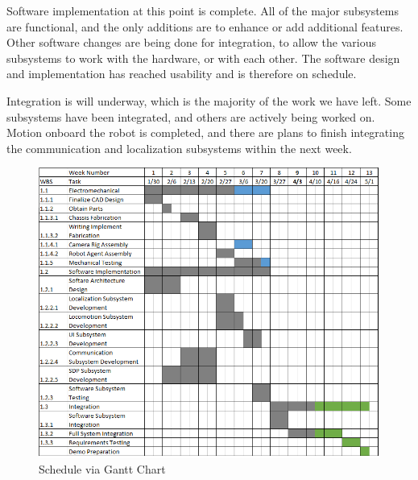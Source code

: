 Software implementation at this point is complete. All of the major subsystems are functional, and the only additions are to enhance or add additional features. Other software changes are being done for integration, to allow the various subsystems to work with the hardware, or with each other. The software design and implementation has reached usability and is therefore on schedule.

Integration is will underway, which is the majority of the work we have left. Some subsystems have been integrated, and others are actively being worked on. Motion onboard the robot is completed, and there are plans to finish integrating the communication and localization subsystems within the next week.

\begin{figure}[!ht]
\centering
\includegraphics[width=0.6\columnwidth]{figs/gantt_chart_4_3_17.png}
\caption{Schedule via Gantt Chart}
\label{fig:gantt_4_3}
\end{figure}

